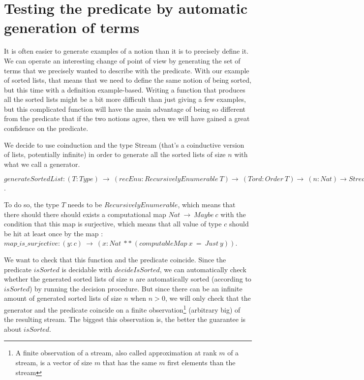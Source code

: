 \section{Testing the predicate by automatic generation of terms}

\label{sect:testingInside}


It is often easier to generate examples of a notion than it is to precisely define it. We can operate an interesting change of point of view by generating the set of terms that we precisely wanted to describe with the predicate. With our example of sorted lists, that means that we need to define the same notion of being sorted, but this time with a definition example-based. Writing a function that produces all the sorted lists might be a bit more difficult than just giving a few examples, but this complicated function will have the main advantage of being so different from the predicate that if the two notions agree, then we will have gained a great confidence on the predicate.

We decide to use coinduction and the type Stream (that's a coinductive version of lists, potentially infinite) in order to generate all the sorted lists of size $n$ with what we call a generator.

$generateSortedList : (T:Type)\ \rightarrow\ (recEnu:RecursivelyEnumerable\ T) \rightarrow\ (Tord : Order\ T) \rightarrow\ (n:Nat) \rightarrow Stream\ (List\ T)$.

To do so, the type $T$ needs to be $RecursivelyEnumerable$, which means that there should there should exists a computational map $Nat\ \rightarrow\ Maybe\ c$ with the condition that this map is surjective, which means that all value of type $c$ should be hit at least once by the map : $map\_is\_surjective : (y:c)\ \rightarrow\ (x:Nat\ **\ (computableMap\ x\ =\ Just\ y))$.

We want to check that this function and the predicate coincide. Since the predicate $isSorted$ is decidable with $decideIsSorted$, we can automatically check whether the generated sorted lists of size $n$ are automatically sorted (according to $isSorted$) by running the decision procedure. But since there can be an infinite amount of generated sorted lists of size $n$ when $n > 0$, we will only check that the generator and the predicate coincide on a finite observation\footnote{A finite observation of a stream, also called approximation at rank $m$ of a stream, is a vector of size $m$ that has the same $m$ first elements than the stream} (arbitrary big) of the resulting stream. The biggest this observation is, the better the guarantee is about $isSorted$.

